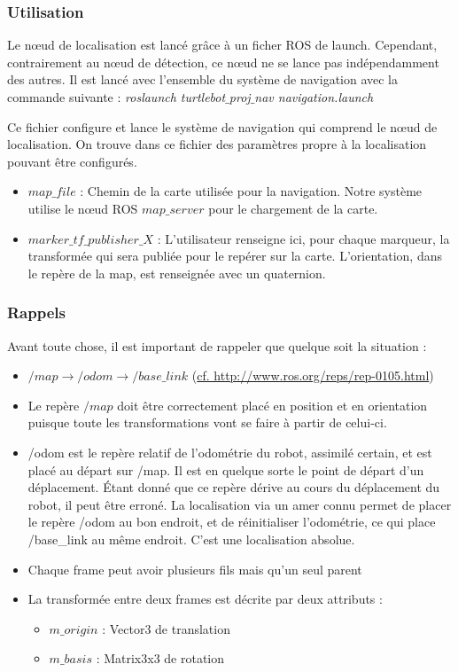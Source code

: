 \documentclass[10pt,a4paper]{article}
\begin{document}
\subsubsection{Utilisation}
Le nœud de localisation est lancé gr\^ace à un ficher ROS de launch. Cependant, contrairement au nœud de détection, ce nœud ne se lance pas indépendamment des autres. Il est lancé avec l'ensemble du système de navigation avec la commande suivante : \textit{roslaunch turtlebot$\_$proj$\_$nav navigation.launch}

Ce fichier configure et lance le système de navigation qui comprend le nœud de localisation. On trouve dans ce fichier des paramètres propre à la localisation pouvant être configurés.
\begin{itemize}
\item $map\_file$ : Chemin de la carte utilisée pour la navigation. Notre système utilise le nœud ROS $map\_server$ pour le chargement de la carte.
\item $marker\_tf\_publisher\_X$ : L'utilisateur renseigne ici, pour chaque marqueur, la transformée qui sera publiée pour le repérer sur la carte. L'orientation, dans le repère de la map, est renseignée avec un quaternion. 
\end{itemize}

\subsubsection{Rappels}
Avant toute chose, il est important de rappeler que quelque soit la situation :
\begin{itemize}
\item $/map \rightarrow /odom \rightarrow /base\_link $ (\url{cf. http://www.ros.org/reps/rep-0105.html})
\item Le repère $/map$ doit être correctement placé en position et en orientation puisque toute les transformations vont se faire à partir de celui-ci.
\item /odom est le repère relatif de l'odométrie du robot, assimilé certain, et est placé au départ sur /map. Il est en quelque sorte le point de départ d'un déplacement. Étant donné que ce repère dérive au cours du déplacement du robot, il peut être erroné. La localisation via un amer connu permet de placer le repère /odom au bon endroit, et de réinitialiser l'odométrie, ce qui place /base\_link au même endroit. C'est une localisation absolue.
\item Chaque frame peut avoir plusieurs fils mais qu'un seul parent
\item La transformée entre deux frames est décrite par deux attributs : 
  \begin{itemize}
  \item $m\_origin$ : Vector3 de translation 
  \item $m\_basis$ : Matrix3x3 de rotation
  \end{itemize}
\end{itemize}
\end{document}
